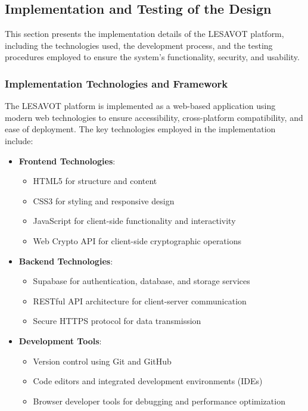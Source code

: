 \documentclass[12pt, a4paper, oneside]{book}
\begin{document}
\subsection{Implementation and Testing of the Design}

This section presents the implementation details of the LESAVOT platform, including the technologies used, the development process, and the testing procedures employed to ensure the system's functionality, security, and usability.

\subsubsection{Implementation Technologies and Framework}

The LESAVOT platform is implemented as a web-based application using modern web technologies to ensure accessibility, cross-platform compatibility, and ease of deployment. The key technologies employed in the implementation include:

\begin{itemize}[leftmargin=*]
    \item \textbf{Frontend Technologies}:
    \begin{itemize}
        \item HTML5 for structure and content
        \item CSS3 for styling and responsive design
        \item JavaScript for client-side functionality and interactivity
        \item Web Crypto API for client-side cryptographic operations
    \end{itemize}

    \item \textbf{Backend Technologies}:
    \begin{itemize}
        \item Supabase for authentication, database, and storage services
        \item RESTful API architecture for client-server communication
        \item Secure HTTPS protocol for data transmission
    \end{itemize}

    \item \textbf{Development Tools}:
    \begin{itemize}
        \item Version control using Git and GitHub
        \item Code editors and integrated development environments (IDEs)
        \item Browser developer tools for debugging and performance optimization
    \end{itemize}
\end{itemize}
\end{document}
